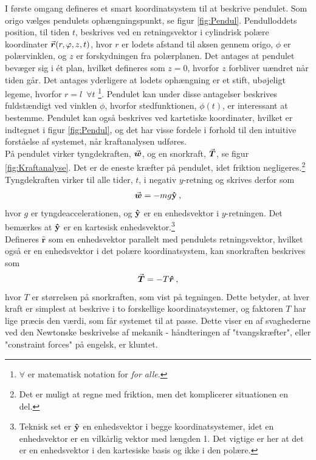 I første omgang defineres et smart koordinatsystem til at beskrive pendulet. Som origo vælges pendulets ophængningspunkt, se figur \ref{fig:Pendul}. Pendulloddets position, til tiden $t$, beskrives ved en retningsvektor i cylindrisk polære koordinater ${\vec{\boldsymbol{r}}}(r,\varphi,z,t)$, hvor $r$ er lodets afstand til aksen gennem origo, $\phi$ er polærvinklen, og $z$ er forskydningen fra polærplanen. Det antages at pendulet bevæger sig i ét plan, hvilket defineres som $z=0$, hvorfor $z$ forbliver uændret når tiden går. Det antages yderligere at lodets ophængning er et stift, ubøjeligt legeme, hvorfor $r=l \enspace\forall t$ \footnote{$\forall$ er matematisk notation for \textit{for alle}.}. Pendulet kan under disse antagelser beskrives fuldstændigt ved vinklen $\phi$, hvorfor stedfunktionen, $\phi(t)$, er interessant at bestemme. Pendulet kan også beskrives ved kartetiske koordinater, hvilket er indtegnet i figur \ref{fig:Pendul}, og det har visse fordele i forhold til den intuitive forståelse af systemet, når kraftanalysen udføres. \\

\noindent
På pendulet virker tyngdekraften, ${\vec{\boldsymbol{w}}}$, og en snorkraft, ${\vec{\boldsymbol{T}}}$, se figur \ref{fig:Kraftanalyse}. Det er de eneste kræfter på pendulet, idet friktion negligeres.\footnote{Det er muligt at regne med friktion, men det komplicerer situationen en del.} Tyngdekraften virker til alle tider, $t$, i negativ $y$-retning og skrives derfor som
\begin{align}
	{\vec{\boldsymbol{w}}} = -mg\mathbf{\hat{y}} \: ,
\end{align}
hvor $g$ er tyngdeaccelerationen, og $\mathbf{\hat{y}}$ er en enhedsvektor i $y$-retningen. Det bemærkes at $\mathbf{\hat{y}}$ er en kartesisk enhedsvektor.\footnote{Teknisk set er $\mathbf{\hat{y}}$ en enhedsvektor i begge koordinatsystemer, idet en enhedsvektor er en vilkårlig vektor med længden 1. Det vigtige er her at det er en enhedsvektor i den kartesiske basis og ikke i den polære.} \\
Defineres $\boldsymbol{\hat{r}}$ som en enhedsvektor parallelt med pendulets retningsvektor, hvilket også er en enhedsvektor i det polære koordinatsystem, kan snorkraften beskrives som
\begin{align}
	{\vec{\boldsymbol{T}}} = -T\boldsymbol{\hat{r}} \: ,
\end{align}
hvor $T$ er størrelsen på snorkraften, som vist på tegningen. Dette betyder, at hver kraft er simplest at beskrive i to forskellige koordinatsystemer, og faktoren $T$ har lige præcis den værdi, som får systemet til at passe. Dette viser en af svaghederne ved den Newtonske beskrivelse af mekanik - håndteringen af "tvangskræfter", eller "constraint forces" på engelsk, er kluntet. \\

